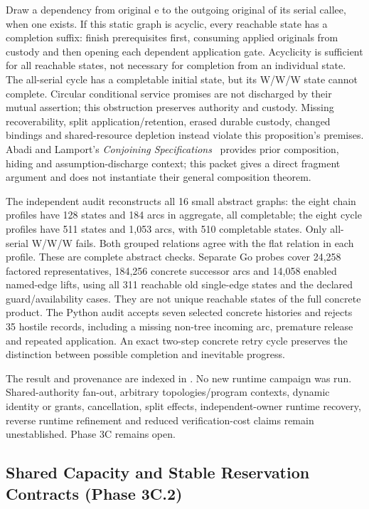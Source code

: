\documentclass[11pt,a4paper]{article}
\theoremstyle{definition}
\theoremstyle{remark}
\begin{document}
Draw a dependency from original e to the outgoing original of its serial callee, when one exists. If this static graph is acyclic, every reachable state has a completion suffix: finish prerequisites first, consuming applied originals from custody and then opening each dependent application gate. Acyclicity is sufficient for all reachable states, not necessary for completion from an individual state. The all-serial cycle has a completable initial state, but its W/W/W state cannot complete. Circular conditional service promises are not discharged by their mutual assertion; this obstruction preserves authority and custody. Missing recoverability, split application/retention, erased durable custody, changed bindings and shared-resource depletion instead violate this proposition's premises. Abadi and Lamport's \emph{Conjoining Specifications}~\cite{abadi1995conjoining} provides prior composition, hiding and assumption-discharge context; this packet gives a direct fragment argument and does not instantiate their general composition theorem.

The independent audit reconstructs all 16 small abstract graphs: the eight chain profiles have 128 states and 184 arcs in aggregate, all completable; the eight cycle profiles have 511 states and 1,053 arcs, with 510 completable states. Only all-serial W/W/W fails. Both grouped relations agree with the flat relation in each profile. These are complete abstract checks. Separate Go probes cover 24,258 factored representatives, 184,256 concrete successor arcs and 14,058 enabled named-edge lifts, using all 311 reachable old single-edge states and the declared guard/availability cases. They are not unique reachable states of the full concrete product. The Python audit accepts seven selected concrete histories and rejects 35 hostile records, including a missing non-tree incoming arc, premature release and repeated application. An exact two-step concrete retry cycle preserves the distinction between possible completion and inevitable progress.

The result and provenance are indexed in . No new runtime campaign was run. Shared-authority fan-out, arbitrary topologies/program contexts, dynamic identity or grants, cancellation, split effects, independent-owner runtime recovery, reverse runtime refinement and reduced verification-cost claims remain unestablished. Phase 3C remains open.

\subsection{Shared Capacity and Stable Reservation Contracts (Phase 3C.2)}
\end{document}
